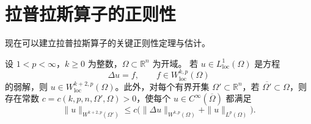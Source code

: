 
\section{拉普拉斯算子的正则性}\label{sec:B-3}

现在可以建立拉普拉斯算子的关键正则性定理与估计。

\begin{theorem}\label{thm:B-3-1}
设 $1<p<\infty$，$k\ge 0$ 为整数，$\Omega\subset\mathbb R^n$ 为开域。
若 $u\in L^1_{\mathrm{loc}}(\Omega)$ 是方程
\[
  \Delta u=f,\qquad f\in W^{k,p}_{\mathrm{loc}}(\Omega)
\]
的弱解，则 $u\in W^{k+2,p}_{\mathrm{loc}}(\Omega)$。此外，对每个有界开集
$\Omega'\subset\mathbb R^n$，若 $\overline{\Omega'}\subset\Omega$，则存在常数
$c=c(k,p,n,\Omega',\Omega)>0$，使每个
$u\in C^\infty(\overline\Omega)$ 都满足
\[
  \|u\|_{W^{k+2,p}(\Omega')}
  \le c\bigl(\|\Delta u\|_{W^{k,p}(\Omega)}
  +\|u\|_{L^p(\Omega)}\bigr).
\]
\end{theorem}

